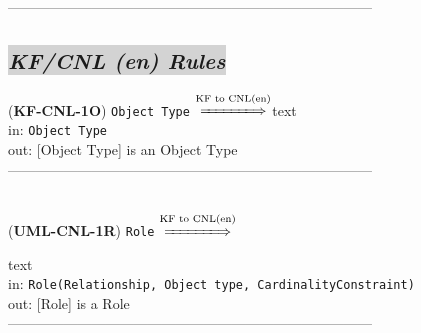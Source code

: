 \documentclass[sn-mathphys]{sn-jnl}
\begin{document}
{{{{\begin{table}[h]
\end{table}



------------------------------------------------------------------------------


\subsection{\colorbox{lightgray}{\em KF/CNL (en) Rules}}

({\bf KF-CNL-1O}) {\tt Object Type} $\overset{\text{KF to CNL(en)}}{\xLongrightarrow{\hspace*{1.4cm}}}${text}\\
\hspace*{0.3cm}in: {\tt Object Type}\\
\hspace*{0.5cm}out: [Object Type] is an Object Type\\

------------------------------------------------------------------------------
\\ \

({\bf UML-CNL-1R}) {\tt Role} $\overset{\text{KF to CNL(en)}}{\xLongrightarrow{\hspace*{1.4cm}}}${text\\
\hspace*{0.3cm}in: {\tt Role(Relationship, Object type, CardinalityConstraint)}\\
\hspace*{0.5cm}out: [Role] is a Role\\
------------------------------------------------------------------------------
\\ \

}}}}}
\end{document}
